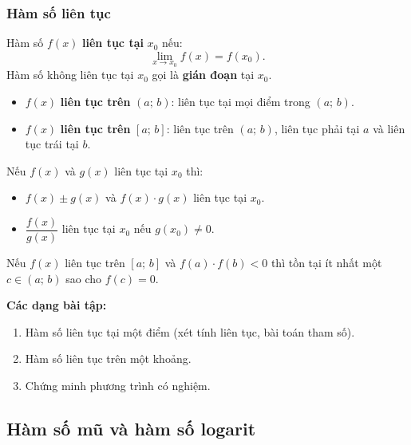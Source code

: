 \documentclass[12pt,a4paper]{article}
\begin{document}
\subsubsection{Hàm số liên tục}

\begin{dinhnghia}
  Hàm số $f(x)$ \textbf{liên tục tại} $x_0$ nếu:
  \[
    \lim_{x \to x_0} f(x) = f(x_0).
  \]
  Hàm số không liên tục tại $x_0$ gọi là \textbf{gián đoạn} tại $x_0$.
\end{dinhnghia}

\begin{dinhnghia}
  \begin{itemize}
    \item $f(x)$ \textbf{liên tục trên} $(a;\,b)$: liên tục tại mọi điểm trong $(a;\,b)$.
    \item $f(x)$ \textbf{liên tục trên} $[a;\,b]$: liên tục trên $(a;\,b)$, liên tục phải tại $a$ và liên tục trái tại $b$.
  \end{itemize}
\end{dinhnghia}

\begin{tinhchat}
  Nếu $f(x)$ và $g(x)$ liên tục tại $x_0$ thì:
  \begin{itemize}
    \item $f(x) \pm g(x)$ và $f(x) \cdot g(x)$ liên tục tại $x_0$.
    \item $\dfrac{f(x)}{g(x)}$ liên tục tại $x_0$ nếu $g(x_0) \ne 0$.
  \end{itemize}
\end{tinhchat}

\begin{dinhly}[title={Định lý giá trị trung gian}]
  Nếu $f(x)$ liên tục trên $[a;\,b]$ và $f(a) \cdot f(b) < 0$ thì tồn tại ít nhất một $c \in (a;\,b)$ sao cho $f(c) = 0$.
\end{dinhly}

\medskip\noindent\textbf{Các dạng bài tập:}
\begin{enumerate}[label=\textbf{Dạng \arabic*:}, leftmargin=*, align=left]
  \item Hàm số liên tục tại một điểm (xét tính liên tục, bài toán tham số).
  \item Hàm số liên tục trên một khoảng.
  \item Chứng minh phương trình có nghiệm.
\end{enumerate}

\subsection{Hàm số mũ và hàm số logarit}
\end{document}
